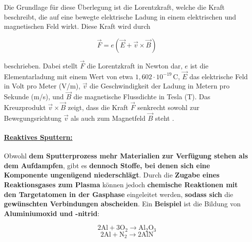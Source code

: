 \documentclass{article} %
\begin{document}
Die Grundlage für diese Überlegung ist die Lorentzkraft, welche die Kraft beschreibt, die auf eine bewegte elektrische Ladung in einem elektrischen und 
magnetischen Feld wirkt. Diese Kraft wird durch

$$
\vec{F} = e (\vec{E} + \vec{v} \times \vec{B})
$$

beschrieben. Dabei stellt \( \vec{F} \) die Lorentzkraft in Newton dar, \( e \) ist die Elementarladung mit einem Wert von etwa 
\( 1{,}602 \cdot 10^{-19} \, \mathrm{C} \), \( \vec{E} \) das elektrische Feld in Volt pro Meter (V/m), \( \vec{v} \) die Geschwindigkeit der
Ladung in Metern pro Sekunde (m/s), und \( \vec{B} \) die magnetische Flussdichte in Tesla (T). Das Kreuzprodukt \( \vec{v} \times \vec{B} \) 
zeigt, dass die Kraft \( \vec{F} \) senkrecht sowohl zur Bewegungsrichtung \( \vec{v} \) als auch zum Magnetfeld \( \vec{B} \) steht \cite{rossnagel2003magnetron, 
mattox2010handbook, anders2010advances, kouznetsov1999new, prechtl2005grundlagen}. 

\vspace{1em}
\paragraph{\uline{Reaktives Sputtern:}} Obwohl \textbf{dem Sputterprozess mehr Materialien zur Verfügung stehen als dem Aufdampfen}, gibt es \textbf{dennoch 
Stoffe, bei denen sich eine Komponente ungenügend niederschlägt}. Durch die \textbf{Zugabe eines Reaktionsgases zum Plasma} können jedoch \textbf{chemische 
Reaktionen mit den Targetatomen in der Gasphase} eingeleitet werden, \textbf{sodass sich} die \textbf{gewünschten Verbindungen abscheiden}. Ein \textbf{Beispiel} 
ist die Bildung von \textbf{Aluminiumoxid und -nitrid}:

$$
\mathrm{2Al} + \mathrm{3O}_2 \rightarrow \mathrm{Al}_2\mathrm{O}_3
$$
$$
\mathrm{2Al} + \mathrm{N}_2 \rightarrow \mathrm{2AlN}
$$
\end{document}
